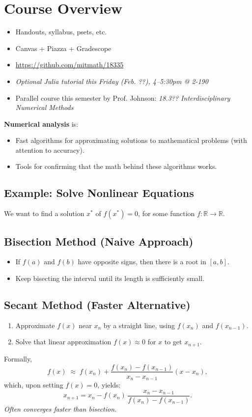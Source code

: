 \section*{Course Overview}
\begin{itemize}
    \item Handouts, syllabus, psets, etc.
    \item Canvas + Piazza + Gradescope
    \item \url{https://github.com/mitmath/18335}
    \item \textit{Optional Julia tutorial this Friday (Feb. ??), 4--5:30pm @ 2-190}
    \item Parallel course this semester by Prof. Johnson: \textit{18.3?? Interdisciplinary Numerical Methods}
\end{itemize}

\noindent
\textbf{Numerical analysis} is:
\begin{itemize}
    \item Fast algorithms for approximating solutions to mathematical problems (with attention to accuracy).
    \item Tools for confirming that the math behind these algorithms works.
\end{itemize}

\subsection*{Example: Solve Nonlinear Equations}
We want to find a solution $x^*$ of $f(x^*) = 0$, for some function $f: \mathbb{R} \to \mathbb{R}$.

\subsection*{Bisection Method (Naive Approach)}
\begin{itemize}
    \item If $f(a)$ and $f(b)$ have opposite signs, then there is a root in $[a, b]$.
    \item Keep bisecting the interval until its length is sufficiently small.
\end{itemize}

\subsection*{Secant Method (Faster Alternative)}
\begin{enumerate}
    \item Approximate $f(x)$ near $x_n$ by a straight line, using $f(x_n)$ and $f(x_{n-1})$.
    \item Solve that linear approximation $f(x) \approx 0$ for $x$ to get $x_{n+1}$.
\end{enumerate}
Formally,
\[
f(x) \;\approx\; f(x_n) + \frac{f(x_n) - f(x_{n-1})}{x_n - x_{n-1}} (x - x_n),
\]
which, upon setting $f(x) = 0$, yields:
\[
x_{n+1} 
= x_n 
- f(x_n)\,\frac{x_n - x_{n-1}}{f(x_n) - f(x_{n-1})}.
\]
\textit{Often converges faster than bisection.}

